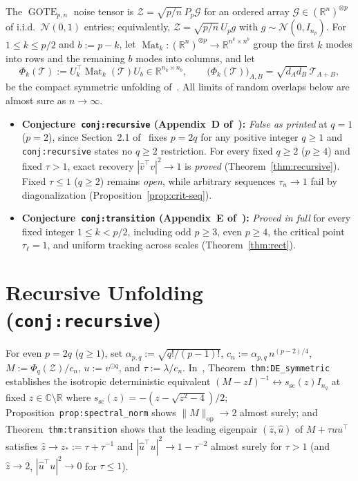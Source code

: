 \documentclass[11pt]{article}
\theoremstyle{plain}
\theoremstyle{definition}
\theoremstyle{remark}
\DeclareMathOperator{\Mat}{Mat}
\DeclareMathOperator{\GOTE}{GOTE}
\begin{document}
The $\GOTE_{p,n}$ noise tensor is $\mathcal{Z} = \sqrt{p/n}\, P_p \mathcal{G}$ for an ordered array $\mathcal{G} \in (\mathbb{R}^n)^{\otimes p}$ of i.i.d.\ $\mathcal{N}(0,1)$ entries; equivalently, $\mathcal{Z} = \sqrt{p/n}\, U_p g$ with $g \sim \mathcal{N}(0, I_{n_p})$. For $1 \le k \le p/2$ and $b := p - k$, let $\Mat_k : (\mathbb{R}^n)^{\otimes p} \to \mathbb{R}^{n^k \times n^b}$ group the first $k$ modes into rows and the remaining $b$ modes into columns, and let
\[
\Phi_k(\mathcal{T}) := U_k^\top \Mat_k(\mathcal{T}) U_b \in \mathbb{R}^{n_k \times n_b},
\qquad
\bigl(\Phi_k(\mathcal{T})\bigr)_{A,B} = \sqrt{d_A d_B}\, \mathcal{T}_{A+B},
\]
be the compact symmetric unfolding of~\cite{Szwagier2026}. All limits of random overlaps below are almost sure as $n \to \infty$.

\begin{itemize}[leftmargin=2em,itemsep=2pt]
\item \textbf{Conjecture~\texttt{conj:recursive} (Appendix~D of~\cite{Szwagier2026}):} \emph{False as printed} at $q = 1$ ($p = 2$), since Section~2.1 of~\cite{Szwagier2026} fixes $p = 2q$ for any positive integer $q \ge 1$ and \texttt{conj:recursive} states no $q \ge 2$ restriction. For every fixed $q \ge 2$ ($p \ge 4$) and fixed $\tau > 1$, exact recovery $|\hat v^\top v|^2 \to 1$ is \emph{proved} (Theorem~\ref{thm:recursive}). Fixed $\tau \le 1$ ($q \ge 2$) remains \emph{open}, while arbitrary sequences $\tau_n \to 1$ fail by diagonalization (Proposition~\ref{prop:crit-seq}).
\item \textbf{Conjecture~\texttt{conj:transition} (Appendix~E of~\cite{Szwagier2026}):} \emph{Proved in full} for every fixed integer $1 \le k < p/2$, including odd $p \ge 3$, even $p \ge 4$, the critical point $\tau_\ell = 1$, and uniform tracking across scales (Theorem~\ref{thm:rect}).
\end{itemize}

\section{Recursive Unfolding (\texttt{conj:recursive})}

For even $p = 2q$ ($q \ge 1$), set $\alpha_{p,q} := \sqrt{q!/(p-1)!}$, $c_n := \alpha_{p,q}\, n^{(p-2)/4}$, $M := \Phi_q(\mathcal{Z}) / c_n$, $u := v^{\odot q}$, and $\tau := \lambda / c_n$. In~\cite{Szwagier2026}, Theorem~\texttt{thm:DE\_symmetric} establishes the isotropic deterministic equivalent $(M - zI)^{-1} \leftrightarrow s_{\mathrm{sc}}(z) I_{n_q}$ at fixed $z \in \mathbb{C} \setminus \mathbb{R}$ where $s_{\mathrm{sc}}(z) = -(z - \sqrt{z^2 - 4})/2$; Proposition~\texttt{prop:spectral\_norm} shows $\|M\|_{\mathrm{op}} \to 2$ almost surely; and Theorem~\texttt{thm:transition} shows that the leading eigenpair $(\hat z, \hat u)$ of $M + \tau u u^\top$ satisfies $\hat z \to z_* := \tau + \tau^{-1}$ and $|\hat u^\top u|^2 \to 1 - \tau^{-2}$ almost surely for $\tau > 1$ (and $\hat z \to 2$, $|\hat u^\top u|^2 \to 0$ for $\tau \le 1$).
\end{document}
